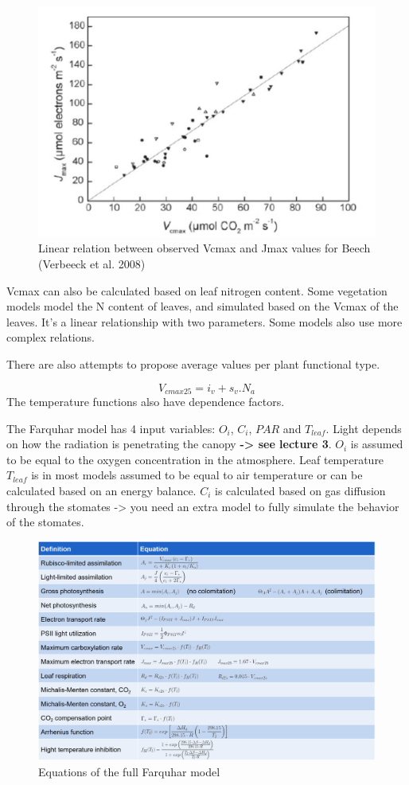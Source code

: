 \documentclass[12pt,oneside]{book}
\begin{document}
\begin{figure}

{\centering \includegraphics[width=0.8\linewidth]{figures/chap2/vcmax_jmax} 

}

\caption{Linear relation between observed Vcmax and Jmax values for Beech (Verbeeck et al. 2008)}\label{fig:f29}
\end{figure}

Vcmax can also be calculated based on leaf nitrogen content. Some
vegetation models model the N content of leaves, and simulated based on
the Vcmax of the leaves. It's a linear relationship with two parameters.
Some models also use more complex relations.

There are also attempts to propose average values per plant functional
type.

\[
V_{cmax25} = i_v + s_v.N_a
\] The temperature functions also have dependence factors.

The Farquhar model has 4 input variables: \(O_i\), \(C_i\), \(PAR\) and
\(T_{leaf}\). Light depends on how the radiation is penetrating the
canopy \textbf{-\textgreater{} see lecture 3}. \(O_i\) is assumed to be
equal to the oxygen concentration in the atmosphere. Leaf temperature
\(T_{leaf}\) is in most models assumed to be equal to air temperature or
can be calculated based on an energy balance. \(C_i\) is calculated
based on gas diffusion through the stomates -\textgreater{} you need an
extra model to fully simulate the behavior of the stomates.

\begin{figure}

{\centering \includegraphics[width=0.8\linewidth]{figures/chap2/full_farquhar} 

}

\caption{Equations of the full Farquhar model}\label{fig:f210}
\end{figure}
\end{document}
